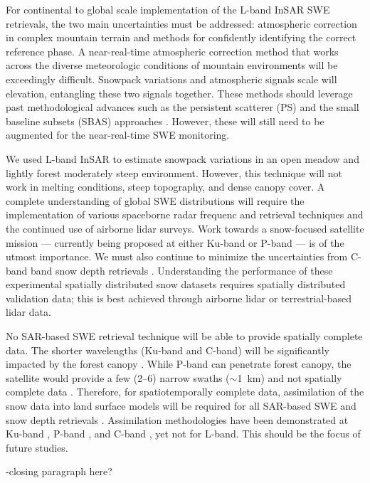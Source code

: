 For continental to global scale implementation of the L-band InSAR SWE retrievals, the two main uncertainties must be addressed: atmospheric correction in complex mountain terrain and methods for confidently identifying the correct reference phase. A near-real-time atmospheric correction method that works across the diverse meteorologic conditions of mountain environments will be exceedingly difficult. Snowpack variations and atmospheric signals scale will elevation, entangling these two signals together. These methods should leverage past methodological advances such as the persistent scatterer (PS) \citep{ferrettiPermanentScatterersSAR2001} and the small baseline subsets (SBAS) approaches \citep{berardinoNewAlgorithmSurface2002a,yunjunSmallBaselineInSAR2019a}. However, these will still need to be augmented for the near-real-time SWE monitoring.

We used L-band InSAR to estimate snowpack variations in an open meadow and lightly forest moderately steep environment. However, this technique will not work in melting conditions, steep topography, and dense canopy cover. A complete understanding of global SWE distributions will require the implementation of various spaceborne radar frequenc and retrieval techniques and the continued use of airborne lidar surveys. Work towards a snow-focused satellite mission --- currently being proposed at either Ku-band \citep{tsangReviewArticleGlobal2022, garnaudQuantifyingSnowMass2019} or P-band \citep{shahRemoteSensingSnow2017} --- is of the utmost importance. We must also continue to minimize the uncertainties from C-band band snow depth retrievals \citep{lievensSnowDepthVariability2019,lievensSentinel1SnowDepth2022}. Understanding the performance of these experimental spatially distributed snow datasets requires spatially distributed validation data; this is best achieved through airborne lidar \citep{painterAirborneSnowObservatory2016} or terrestrial-based lidar data.

No SAR-based SWE retrieval technique will be able to provide spatially complete data. The shorter wavelengths (Ku-band and C-band) will be significantly impacted by the forest canopy \citep{rottColdRegionsHydrology2010}. While P-band can penetrate forest canopy, the satellite would provide a few (2--6) narrow swaths ($\sim$1~km) and not spatially complete data \citep{yuehSatelliteSyntheticAperture2021}. Therefore, for spatiotemporally complete data, assimilation of the snow data into land surface models will be required for all SAR-based SWE and snow depth retrievals \citep{girottoDataAssimilationImproves2020}. Assimilation methodologies have been demonstrated at Ku-band \citep{wrzesienDevelopmentNatureRun2022, choEvaluatingUtilityActive2022}, P-band \citep{maEstimatingSpatiotemporallyContinuous2023}, and C-band \citep{girottoIdentifyingSnowfallElevation2023, brangersSentinel1SnowDepth2023}, yet not for L-band. This should be the focus of future studies.

-closing paragraph here?



